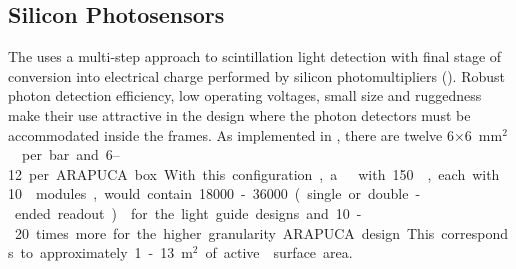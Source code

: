 




\subsection{Silicon Photosensors}
\label{sec:fdsp-pd-ps}

The   uses a multi-step approach to scintillation light detection with final stage of conversion into electrical charge performed by silicon photomultipliers (). Robust photon detection efficiency, low operating voltages, small size and ruggedness make their use attractive in the \single design where the photon detectors must be accommodated inside the  frames. 
As implemented in , there are twelve \num{6}$\times$\SI{6}{mm$^2$}  per bar and \numrange{6}{12} per ARAPUCA box.
With this configuration, a \nominalmodsize {} with \num{150} , each with \num{10}  modules, would contain \num{18000}-\num{36000} (single or double-ended readout)  for the light guide designs and 10-20 times more for the higher granularity ARAPUCA design. This corresponds to approximately \num{1}-\SI{13}{m$^2$} of active  surface area.

